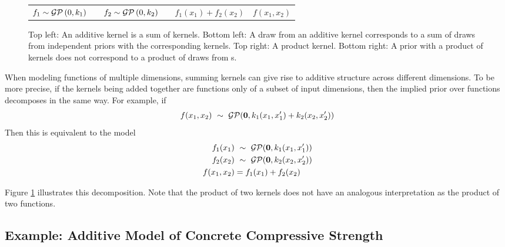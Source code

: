 \begin{figure}
\begin{tabular}{ccccc|c}
$f_1 \sim \mathcal{GP}\left(0, k_1\right)$ & & $f_2 \sim \mathcal{GP}\left(0, k_2\right)$ & & $f_1(x_1) + f_2(x_2)$ & $f(x_1, x_2)$ \\
\end{tabular}
\caption[Additive kernels correspond to additive functions]{
Top left: An additive kernel is a sum of kernels.
Bottom left:  A draw from an additive kernel corresponds to a sum of draws from independent \gp{} priors with the corresponding kernels.
Top right: A product kernel.
Bottom right:  A \gp{} prior with a product of kernels does not correspond to a product of draws from \gp{}s.
}
\label{fig:kernels}
\end{figure}

When modeling functions of multiple dimensions, summing kernels can give rise to additive structure across different dimensions.
To be more precise, if the kernels being added together are functions only of a subset of input dimensions, then the implied prior over functions decomposes in the same way.
For example, if
%
\begin{align}
f(x_1, x_2) \ \sim\  \mathcal{GP}({\bf{0}}, k_1(x_1, x_1') + k_2(x_2, x_2'))
\end{align}
%
Then this is equivalent to the model
%
\begin{align}
f_1(x_1) & \ \sim\  \mathcal{GP}({\bf{0}}, k_1(x_1, x_1'))\\
f_2(x_2) & \ \sim\  \mathcal{GP}({\bf{0}}, k_2(x_2, x_2'))\\
f(x_1, x_2) & = f_1(x_1) + f_2(x_2)
\end{align}
%
%

Figure \ref{fig:kernels} illustrates this decomposition.
Note that the product of two kernels does not have an analogous interpretation as the product of two functions.



\subsection{Example: Additive Model of Concrete Compressive Strength}
\label{sec:concrete}

